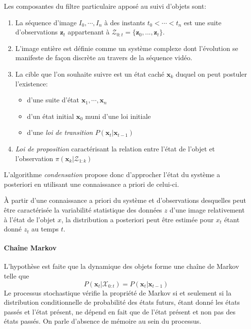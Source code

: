 \documentclass[a4paper,12pt]{report}
\begin{document}
Les composantes du filtre particulaire apposé au suivi d'objets sont:
\begin{enumerate}
\item La séquence d'image $I_0,\cdots,I_n$ à des instants $t_0<\cdots<t_n$ est une suite d'observations $\mathbf{z}_t$ appartenant à $ \mathcal{Z}_{0:t}=\{\mathbf{z}_0,...,\mathbf{z}_t\}$.
\item[] L'image entière est définie comme un système complexe dont l'évolution se manifeste de façon discrète au travers de la séquence vidéo.
\item La cible que l'on souhaite suivre est un état caché $\mathbf{x}_k$ duquel on peut postuler l'existence:
	\begin{itemize}
	\item d'une suite d'état $\mathbf{x}_1,\cdots,\mathbf{x}_n$
	\item d'un état initial $\mathbf{x}_0$ muni d'une loi initiale
	\item d'une \textit{loi de transition} $P(\mathbf{x}_t|\mathbf{x}_{t-1})$
\end{itemize}
\item \textit{Loi de proposition} caractérisant la relation entre l'état de l'objet et l'observation $\pi(\mathbf{x}_k|\mathcal{Z}_{1:k})$\\
\end{enumerate}

L'algorithme \textit{condensation} propose donc d'approcher l'état du système a posteriori en utilisant une connaissance a priori de celui-ci.
 
À partir d'une connaissance a priori du système et d'observations desquelles peut être caractérisée la variabilité statistique des données $z$ d'une image relativement à l'état de l'objet $x$, la distribution a posteriori peut être estimée pour $x_t$ étant donné $z_t$ au temps $t$.\\

\paragraph{Chaîne Markov}
L'hypothèse est faite que la dynamique des objets forme une chaîne de Markov telle que $$P(\mathbf{x}_{t}|\mathcal{X}_{0:t})=P(\mathbf{x}_t|\mathbf{x}_{t-1})$$
Le processus stochastique vérifie la propriété de Markov si et seulement si la distribution conditionnelle de probabilité des états futurs, étant donné les états passés et l'état présent, ne dépend en fait que de l'état présent et non pas des états passés. On parle d'absence de mémoire au sein du processus.
\end{document}
